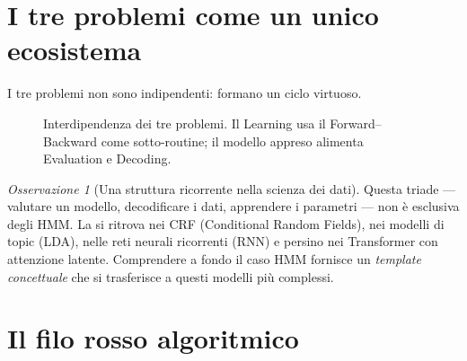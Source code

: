 \documentclass[11pt,a4paper,oneside]{book}
\theoremstyle{plain}
\theoremstyle{definition}
\theoremstyle{remark}
\newtheorem{osservazione}[teorema]{Osservazione}
\newcommand{\Prob}{\mathbb{P}}
\newcommand{\hmm}{\lambda}                   %
\newcommand{\seqobs}{\mathbf{o}}             %
\newcommand{\fwd}{\alpha}                    %
\newcommand{\bwd}{\beta}                     %
\newcommand{\given}{\,\vert\,}
\begin{document}
\section{I tre problemi come un unico ecosistema}

I tre problemi non sono indipendenti: formano un ciclo virtuoso.

\begin{figure}[h!]
\centering
{}
\caption{Interdipendenza dei tre problemi. Il Learning usa il Forward--Backward
come sotto-routine; il modello appreso alimenta Evaluation e Decoding.}
\label{fig:three_problems_cycle}
\end{figure}

\begin{osservazione}[Una struttura ricorrente nella scienza dei dati]
Questa triade --- valutare un modello, decodificare i dati, apprendere
i parametri --- non è esclusiva degli HMM. La si ritrova nei CRF
(Conditional Random Fields), nei modelli di topic (LDA), nelle reti
neurali ricorrenti (RNN) e persino nei Transformer con attenzione
latente. Comprendere a fondo il caso HMM fornisce un \emph{template
concettuale} che si trasferisce a questi modelli più complessi.
\end{osservazione}

\section{Il filo rosso algoritmico}
\end{document}
